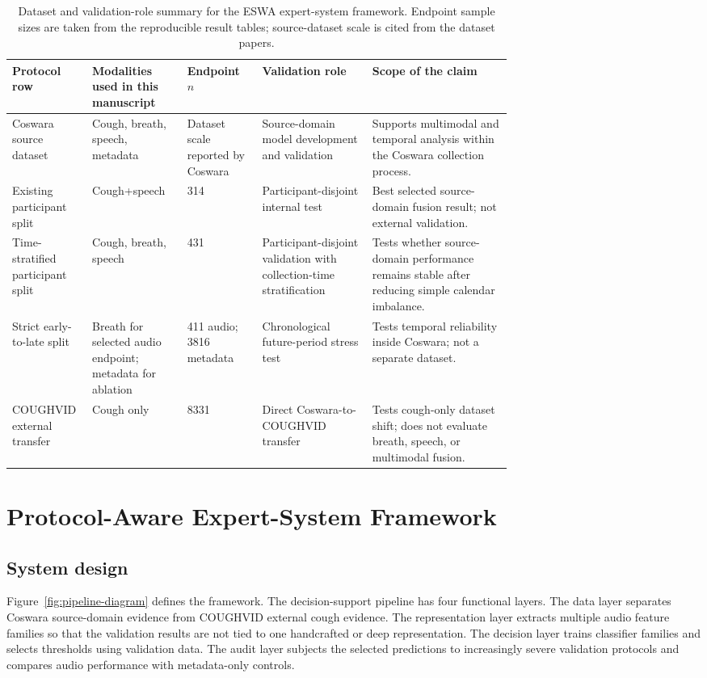 \documentclass[preprint,12pt]{elsarticle}
\begin{document}
\begin{table}[t]
\centering
\caption{Dataset and validation-role summary for the ESWA expert-system framework. Endpoint sample sizes are taken from the reproducible result tables; source-dataset scale is cited from the dataset papers.}
\label{tab:dataset-protocol}
\scriptsize
\setlength{\tabcolsep}{2.5pt}
\begin{tabularx}{\linewidth}{p{0.16\linewidth} p{0.19\linewidth} p{0.15\linewidth} p{0.22\linewidth} X}
\toprule
Protocol row & Modalities used in this manuscript & Endpoint $n$ & Validation role & Scope of the claim \\
\midrule
Coswara source dataset & Cough, breath, speech, metadata & Dataset scale reported by Coswara & Source-domain model development and validation & Supports multimodal and temporal analysis within the Coswara collection process. \\
Existing participant split & Cough+speech & 314 & Participant-disjoint internal test & Best selected source-domain fusion result; not external validation. \\
Time-stratified participant split & Cough, breath, speech & 431 & Participant-disjoint validation with collection-time stratification & Tests whether source-domain performance remains stable after reducing simple calendar imbalance. \\
Strict early-to-late split & Breath for selected audio endpoint; metadata for ablation & 411 audio; 3816 metadata & Chronological future-period stress test & Tests temporal reliability inside Coswara; not a separate dataset. \\
COUGHVID external transfer & Cough only & 8331 & Direct Coswara-to-COUGHVID transfer & Tests cough-only dataset shift; does not evaluate breath, speech, or multimodal fusion. \\
\bottomrule
\end{tabularx}
\end{table}

\section{Protocol-Aware Expert-System Framework}

\subsection{System design}

Figure~\ref{fig:pipeline-diagram} defines the framework. The decision-support pipeline has four functional layers. The data layer separates Coswara source-domain evidence from COUGHVID external cough evidence. The representation layer extracts multiple audio feature families so that the validation results are not tied to one handcrafted or deep representation. The decision layer trains classifier families and selects thresholds using validation data. The audit layer subjects the selected predictions to increasingly severe validation protocols and compares audio performance with metadata-only controls.
\end{document}
